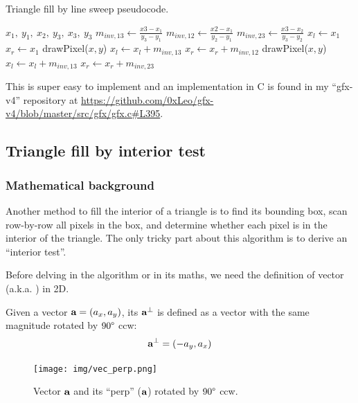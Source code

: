 \documentclass[a4paper]{article}
\begin{document}
\begin{algorithm}[H]
\caption{Triangle fill by line sweep pseudocode.}
\begin{algorithmic}[1]
 {$x_1,\ y_1,\ x_2,\ y_3,\ x_3,\ y_3$} 
    \State $m_{inv,13} \leftarrow \frac{x3-x_1}{y_3 - y_1}$
    \State $m_{inv,12} \leftarrow \frac{x2-x_1}{y_2 - y_1}$
    \State $m_{inv,23} \leftarrow \frac{x3-x_2}{y_3 - y_2}$
    \State $x_l \leftarrow x_1$
    \State $x_r \leftarrow x_1$
     
         
            \State drawPixel($x,y$)
        \EndFor
        \State $x_l \leftarrow x_l + m_{inv,13}$
        \State $x_r \leftarrow x_r + m_{inv,12}$
    \EndFor
     
            \State drawPixel($x,y$)
        \EndFor
        \State $x_l \leftarrow x_l +  m_{inv,13}$
        \State $x_r \leftarrow x_r +  m_{inv,23}$
    \EndFor
\EndProcedure
\end{algorithmic}
\label{alg:triangle_fill_line_sweep}
\end{algorithm}
This is super easy to implement and an implementation in C is found in my ``gfx-v4'' repository at \url{https://github.com/0xLeo/gfx-v4/blob/master/src/gfx/gfx.c#L395}.




\subsection{Triangle fill by interior test}


\subsubsection{Mathematical background}
Another method to fill the interior of a triangle is to find its bounding box, scan row-by-row all pixels in the box, and determine whether each pixel is in the interior of the triangle. The only tricky part about this algorithm is to derive an ``interior test''.

Before delving in the algorithm or in its maths, we need the definition of  vector (a.k.a. ) in 2D.
\begin{definition}
Given a vector $\textbf{a} = (a_x, a_y)$, its  $\textbf{a}^{\bot}$ is defined as a vector with the same magnitude rotated by $90\degree$ ccw:
\begin{equation}
\textbf{a}^{\bot} = (-a_y, a_x)
\end{equation}
\end{definition}
\begin{figure}[H]
    \centering
    \texttt{[image: img/vec\_perp.png]}
    \caption{Vector $\textbf{a}$ and its ``perp'' ($\textbf{a}$) rotated by $90\degree$ ccw.}
\end{figure}
\end{document}
